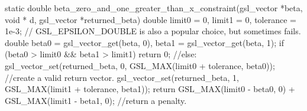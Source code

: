 static double beta_zero_and_one_greater_than_x_constraint(gsl_vector *beta, void * d, gsl_vector *returned_beta){
double          limit0          = 0,
                limit1          = 0,
                tolerance       = 1e-3; // GSL_EPSILON_DOUBLE is also a popular choice, but sometimes fails.
double          beta0   = gsl_vector_get(beta, 0),
                beta1   = gsl_vector_get(beta, 1);
        if (beta0 > limit0 && beta1 > limit1)
                return 0;
        //else:
        gsl_vector_set(returned_beta, 0, GSL_MAX(limit0 + tolerance, beta0));   //create a valid return vector.
        gsl_vector_set(returned_beta, 1, GSL_MAX(limit1 + tolerance, beta1));
        return GSL_MAX(limit0 - beta0, 0) + GSL_MAX(limit1 - beta1, 0);         //return a penalty.
}
